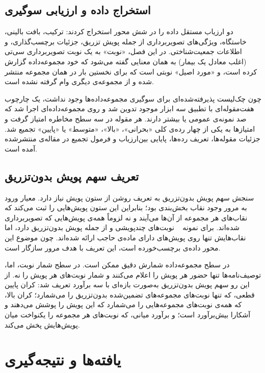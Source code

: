 \subsection{استخراج داده و ارزیابی سوگیری}

دو ارزیاب مستقل داده را در شش محور استخراج کردند: ترکیب، بافت بالینی، خاستگاه، ویژگی‌های تصویربرداری از جمله پویش تزریق، جزئیات برچسب‌گذاری، و اطلاعات جمعیت‌شناختی. در این فصل، «نوبت» به یک نوبت تصویربرداری سی‌تی (اغلب معادل یک بیمار) به همان معنایی گفته می‌شود که خود مجموعه‌داده گزارش کرده است، و «مورد اصیل» نوبتی است که برای نخستین بار در همان مجموعه منتشر شده و از مجموعه‌ی دیگری وام گرفته نشده است.

چون چک‌لیست پذیرفته‌شده‌ای برای سوگیری مجموعه‌داده‌ها وجود نداشت، یک چارچوب هفت‌مقوله‌ای با تطبیق سه ابزار موجود تدوین شد و روی  مجموعه‌داده‌ای اجرا شد که صد نمونه‌ی عمومی یا بیشتر دارند. هر مقوله در سه سطح مخاطره امتیاز گرفت و امتیازها به یکی از چهار رده‌ی کلی «بحرانی»، «بالا»، «متوسط» یا «پایین» تجمیع شد. جزئیات مقوله‌ها، تعریف رده‌ها، پایایی بین‌ارزیاب و فرمول تجمیع در مقاله‌ی منتشرشده آمده است.

\subsection{تعریف سهم پویش بدون‌تزریق}
\label{sec:s-phase-def}

سنجش سهم پویش بدون‌تزریق به تعریف روشن از ستون پویش نیاز دارد. معیار ورود به مرور وجود نقاب بخش‌بندی بود؛ بنابراین این ستون پویش‌هایی را ثبت می‌کند که نقاب‌های هر مجموعه از آن‌ها می‌آیند و نه لزوماً همه‌ی پویش‌هایی که تصویربرداری شده‌اند. برای نمونه ~\cite{sobotka2024wawtace} نوبت‌های چندپویشی و از جمله پویش بدون‌تزریق دارد، اما نقاب‌هایش تنها روی پویش‌های دارای ماده‌ی حاجب ارائه شده‌اند. چون موضوع این محور داده‌ی برچسب‌خورده است، این تعریف با هدف مرور سازگار است.

در سطح مجموعه‌داده شمارش دقیق ممکن است. در سطح شمار نوبت، اما، توصیف‌نامه‌ها تنها حضور هر پویش را اعلام می‌کنند و شمار نوبت‌های هر پویش را نه. از این رو سهم پویش بدون‌تزریق به‌صورت بازه‌ای با سه برآورد تعریف شد: کران پایین قطعی، که تنها نوبت‌های مجموعه‌های تضمین‌شده بدون‌تزریق را می‌شمارد؛ کران بالا، که همه‌ی نوبت‌های مجموعه‌هایی را می‌شمارد که این پویش را پوشش می‌دهند و آشکارا بیش‌برآورد است؛ و برآورد میانی، که نوبت‌های هر مجموعه را یکنواخت میان پویش‌هایش پخش می‌کند.

\section{یافته‌ها و نتیجه‌گیری}
\label{sec:s-results}


